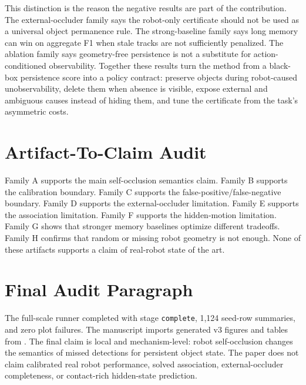\documentclass{article}
\begin{document}
This distinction is the reason the negative results are part of the contribution.
The external-occluder family says the robot-only certificate should not be used
as a universal object permanence rule. The strong-baseline family says long
memory can win on aggregate F1 when stale tracks are not sufficiently penalized.
The ablation family says geometry-free persistence is not a substitute for
action-conditioned observability. Together these results turn the method from a
black-box persistence score into a policy contract: preserve objects during
robot-caused unobservability, delete them when absence is visible, expose
external and ambiguous causes instead of hiding them, and tune the certificate
from the task's asymmetric costs.

\section{Artifact-To-Claim Audit}

Family A supports the main self-occlusion semantics claim. Family B supports
the calibration boundary. Family C supports the false-positive/false-negative
boundary. Family D supports the external-occluder limitation. Family E supports
the association limitation. Family F supports the hidden-motion limitation.
Family G shows that stronger memory baselines optimize different tradeoffs.
Family H confirms that random or missing robot geometry is not enough. None of
these artifacts supports a claim of real-robot state of the art.

\section{Final Audit Paragraph}

The full-scale runner completed with stage \texttt{complete}, 1,124 seed-row
summaries, and zero plot failures. The manuscript imports generated v3 figures
and tables from . The final claim is local and
mechanism-level: robot self-occlusion changes the semantics of missed detections
for persistent object state. The paper does not claim calibrated real robot
performance, solved association, external-occluder completeness, or contact-rich
hidden-state prediction.
\end{document}
